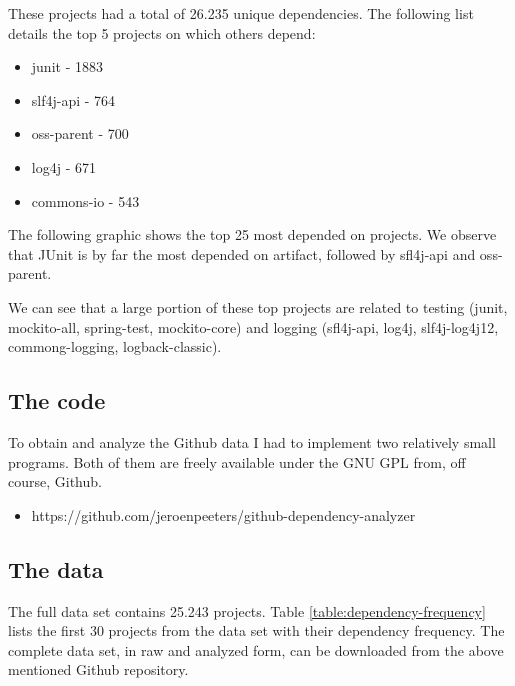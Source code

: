 These projects had a total of 26.235 unique dependencies. The following list details the top 5 projects on which others depend:

\begin{itemize}
	\item junit - 1883
	\item slf4j-api - 764
	\item oss-parent - 700
	\item log4j - 671
	\item commons-io - 543
\end{itemize}

The following graphic shows the top 25 most depended on projects. We observe that JUnit is by far the most depended on artifact, followed by sfl4j-api and oss-parent.

We can see that a large portion of these top projects are related to testing (junit, mockito-all, spring-test, mockito-core) and logging (sfl4j-api, log4j, slf4j-log4j12, commong-logging, logback-classic).

\subsection{The code}

To obtain and analyze the Github data I had to implement two relatively small programs. Both of them are freely available under the GNU GPL from, off course, Github.

\begin{itemize}
	\item https://github.com/jeroenpeeters/github-dependency-analyzer
\end{itemize}

\subsection{The data}

The full data set contains 25.243 projects. Table \ref{table:dependency-frequency} lists the first 30 projects from the data set with their dependency frequency.
The complete data set, in raw and analyzed form, can be downloaded from the above mentioned Github repository. 

